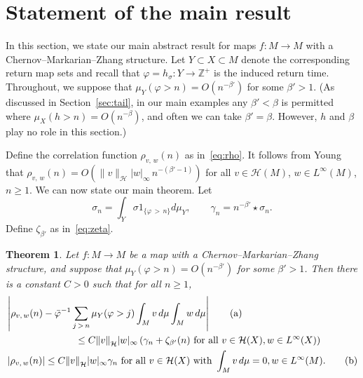 \documentclass[10pt]{amsart}
\newtheorem{theo}{Theorem}[section]
\theoremstyle{definition}\newtheorem{defi}[theo]{Definition}\newtheorem{rema}[theo]{Remark}\newtheorem{exam}[theo]{Example}\newtheorem{exem}[theo]{Example}\newtheorem{nota}[theo]{Notation}
\newcommand{\Z}{\mathbb{Z}}
\newcommand{\cH}{\mathcal{H}}
\newcommand{\bvarphi}{\bar{\varphi}}
\newcommand*{\alphenumi}{\renewcommand*{\theenumi}{\alph{enumi}}}
\begin{document}
\section{Statement of the main result}\label{sec:main}

In this section, we state our main abstract result for maps $f:M\to M$ with a Chernov--Markarian--Zhang structure. Let $Y\subset X\subset M$ denote the corresponding return map sets and recall that $\varphi=h_\sigma:Y\to\Z^+$ is the induced return time. Throughout, we suppose that $\mu_Y(\varphi>n)=O(n^{-\beta'})$ for some $\beta'>1$. (As discussed in Section~\ref{sec:tail}, in our main examples any $\beta'<\beta$ is permitted where $\mu_X(h>n)=O(n^{-\beta})$, and often we can take $\beta'=\beta$. However, $h$ and $\beta$ play no role in this section.)



Define the correlation function $\rho_{v,\,w}(n)$ as in~\eqref{eq:rho}. It follows from Young~\cite{Young99} that $\rho_{v,\,w}(n)=O(\|v\|_\cH |w|_\infty\, n^{-(\beta'-1)})$ for all $v\in\cH(M)$, $w\in L^\infty(M)$, $n\ge1$. We can now state our main theorem. Let
\begin{equation}\label{eq:gamma}
 \sigma_n= \int_Y \sigma 1_{\{\varphi\,>\,n\}}d\mu_Y, \qquad
\gamma_n=n^{-\beta'}\star \sigma_n.
\end{equation}
Define $\zeta_{\beta'}$ as in~\eqref{eq:zeta}.

\begin{theo} \label{thm:main}
Let $f:M\to M$ be a map with a Chernov--Markarian--Zhang structure, and suppose that $\mu_Y(\varphi>n)=O(n^{-\beta'})$ for some $\beta'>1$. Then there is a constant $C>0$ such that for all $n\ge1$,
\begin{align}
&\left|\rho_{v,\,w}(n)-\bvarphi^{-1}\sum_{j\,>\,n} \mu_Y(\varphi>j)\int_Mv\,d\mu\int_Mw\,d\mu\right|\tag{${\rm a}$}\label{theo3.1.1}
\\
&\mkern130mu\le C{\|v\|}_{\cH}|w|_\infty\left(\gamma_n+\zeta_{\beta'}(n)\text{ for all }v\in \cH(X), w\in L^\infty(X)\right)\nonumber\\
 &\left|\rho_{v,\,w}(n)\right|\le C{\|v\|}_{\cH}|w|_\infty\gamma_n\text{ for all }v\in \cH(X)\text{ with }\int_M v\,d\mu=0, w\in L^\infty(M).\tag{${\rm b}$}\label{theo3.1.2}
\end{align}
\end{theo}
\end{document}
